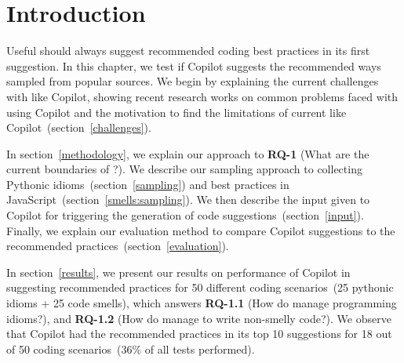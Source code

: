 \label{chapter:methodology}

\section{Introduction}
Useful \cct{} should always suggest recommended coding best practices in its first suggestion. In this chapter, we test if Copilot suggests the recommended ways sampled from popular sources.
We begin by explaining the current challenges with \cct{} like Copilot, showing recent research works on common problems faced with using Copilot and the motivation to find the limitations of current \cct{} like Copilot~(section~\ref{challenges}).

In section~\ref{methodology}, we explain our approach to \textbf{RQ-1} (What are the current boundaries of \cct{}?). 
We describe our sampling approach to collecting Pythonic idioms~(section~\ref{sampling}) and best practices in JavaScript~(section~\ref{smells:sampling}). We then describe the input given to Copilot for triggering the generation of code suggestions~(section~\ref{input}).
Finally, we explain our evaluation method to compare Copilot suggestions to the recommended practices~(section~\ref{evaluation}).

In section~\ref{results}, we present our results on performance of Copilot in suggesting recommended practices for 50 different coding scenarios~(25 pythonic idioms + 25 code smells), which answers \textbf{RQ-1.1} (How do \cct{} manage programming idioms?), and \textbf{RQ-1.2} (How do \cct{} manage to write non-smelly code?).
We observe that Copilot had the recommended practices in its top 10 suggestions for 18 out of 50 coding scenarios~(36\% of all tests performed).



